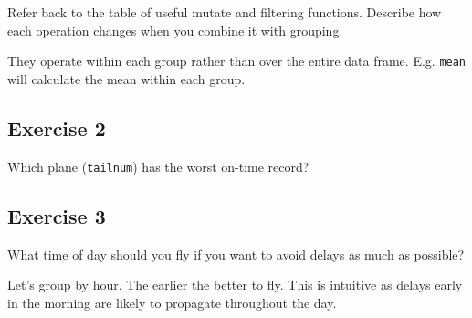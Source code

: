 \documentclass[]{book}
\newenvironment{Shaded}{\begin{snugshade}}{\end{snugshade}}
\newcommand{\CommentTok}[1]{\textcolor[rgb]{0.56,0.35,0.01}{\textit{#1}}}
\newcommand{\DataTypeTok}[1]{\textcolor[rgb]{0.13,0.29,0.53}{#1}}
\newcommand{\DecValTok}[1]{\textcolor[rgb]{0.00,0.00,0.81}{#1}}
\newcommand{\KeywordTok}[1]{\textcolor[rgb]{0.13,0.29,0.53}{\textbf{#1}}}
\newcommand{\NormalTok}[1]{#1}
\newcommand{\OperatorTok}[1]{\textcolor[rgb]{0.81,0.36,0.00}{\textbf{#1}}}
\newcommand{\OtherTok}[1]{\textcolor[rgb]{0.56,0.35,0.01}{#1}}
\newcommand{\StringTok}[1]{\textcolor[rgb]{0.31,0.60,0.02}{#1}}
\theoremstyle{plain}
\theoremstyle{remark}
\theoremstyle{definition}
\theoremstyle{definition}
\theoremstyle{definition}
\theoremstyle{remark}
\begin{document}
Refer back to the table of useful mutate and filtering functions.
Describe how each operation changes when you combine it with grouping.

They operate within each group rather than over the entire data frame.
E.g. \texttt{mean} will calculate the mean within each group.

\hypertarget{exercise-2-10}{%
\subsection{Exercise 2}\label{exercise-2-10}}

Which plane (\texttt{tailnum}) has the worst on-time record?

\begin{Shaded}
\end{Shaded}

\hypertarget{exercise-3-10}{%
\subsection{Exercise 3}\label{exercise-3-10}}

What time of day should you fly if you want to avoid delays as much as
possible?

Let's group by hour. The earlier the better to fly. This is intuitive as
delays early in the morning are likely to propagate throughout the day.

\begin{Shaded}
\end{Shaded}
\end{document}
